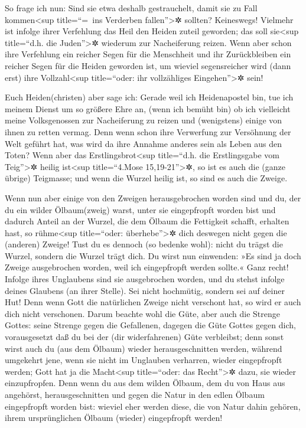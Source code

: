  So frage ich nun: Sind sie etwa deshalb gestrauchelt,
damit sie zu Fall kommen\textless sup title=``=~ins Verderben
fallen''\textgreater✲ sollten? Keineswegs! Vielmehr ist infolge ihrer
Verfehlung das Heil den Heiden zuteil geworden; das soll
sie\textless sup title=``d.h. die Juden''\textgreater✲ wiederum zur
Nacheiferung reizen.  Wenn aber schon ihre Verfehlung ein
reicher Segen für die Menschheit und ihr Zurückbleiben ein reicher Segen
für die Heiden geworden ist, um wieviel segensreicher wird (dann erst)
ihre Vollzahl\textless sup title=``oder: ihr vollzähliges
Eingehen''\textgreater✲ sein!

 Euch Heiden(christen) aber sage ich: Gerade weil ich
Heidenapostel bin, tue ich meinem Dienst um so größere Ehre an,
 (wenn ich bemüht bin) ob ich vielleicht meine
Volksgenossen zur Nacheiferung zu reizen und (wenigstens) einige von
ihnen zu retten vermag.  Denn wenn schon ihre Verwerfung
zur Versöhnung der Welt geführt hat, was wird da ihre Annahme anderes
sein als Leben aus den Toten?  Wenn aber das
Erstlingsbrot\textless sup title=``d.h. die Erstlingsgabe vom
Teig''\textgreater✲ heilig ist\textless sup title=``4.Mose
15,19-21''\textgreater✲, so ist es auch die (ganze übrige) Teigmasse;
und wenn die Wurzel heilig ist, so sind es auch die Zweige.

 Wenn nun aber einige von den Zweigen herausgebrochen
worden sind und du, der du ein wilder Ölbaum(zweig) warst, unter sie
eingepfropft worden bist und dadurch Anteil an der Wurzel, die dem
Ölbaum die Fettigkeit schafft, erhalten hast,  so
rühme\textless sup title=``oder: überhebe''\textgreater✲ dich deswegen
nicht gegen die (anderen) Zweige! Tust du es dennoch (so bedenke wohl):
nicht du trägst die Wurzel, sondern die Wurzel trägt dich.
 Du wirst nun einwenden: »Es sind ja doch Zweige
ausgebrochen worden, weil ich eingepfropft werden sollte.«
 Ganz recht! Infolge ihres Unglaubens sind sie
ausgebrochen worden, und du stehst infolge deines Glaubens (an ihrer
Stelle). Sei nicht hochmütig, sondern sei auf deiner Hut!
 Denn wenn Gott die natürlichen Zweige nicht verschont
hat, so wird er auch dich nicht verschonen.  Darum
beachte wohl die Güte, aber auch die Strenge Gottes: seine Strenge gegen
die Gefallenen, dagegen die Güte Gottes gegen dich, vorausgesetzt daß du
bei der (dir widerfahrenen) Güte verbleibst; denn sonst wirst auch du
(aus dem Ölbaum) wieder herausgeschnitten werden, 
während umgekehrt jene, wenn sie nicht im Unglauben verharren, wieder
eingepfropft werden; Gott hat ja die Macht\textless sup title=``oder:
das Recht''\textgreater✲ dazu, sie wieder einzupfropfen. 
Denn wenn du aus dem wilden Ölbaum, dem du von Haus aus angehörst,
herausgeschnitten und gegen die Natur in den edlen Ölbaum eingepfropft
worden bist: wieviel eher werden diese, die von Natur dahin gehören,
ihrem ursprünglichen Ölbaum (wieder) eingepfropft werden!

